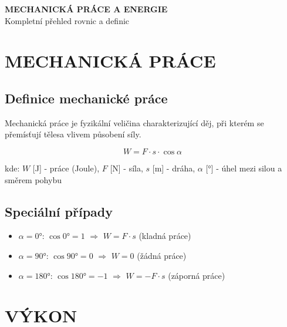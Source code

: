 \documentclass[a4paper,11pt]{article}
\begin{document}
\begin{center}
    {\Huge \textbf{MECHANICKÁ PRÁCE A ENERGIE}}\\[0.5cm]
    {\Large Kompletní přehled rovnic a definic}\\[1cm]
\end{center}

\section{MECHANICKÁ PRÁCE}

\subsection{Definice mechanické práce}

\begin{definitionbox}
Mechanická práce je fyzikální veličina charakterizující děj, při kterém se přemísťují tělesa vlivem působení síly.
\end{definitionbox}

\begin{equationbox}
\begin{equation*}
    W = F \cdot s \cdot \cos\alpha
\end{equation*}
\end{equationbox}

\begin{notebox}
kde: $W$ [J] - práce (Joule), $F$ [N] - síla, $s$ [m] - dráha, $\alpha$ [°] - úhel mezi silou a směrem pohybu
\end{notebox}

\subsection{Speciální případy}

\begin{notebox}
\begin{itemize}
    \item $\alpha = 0°$: $\cos 0° = 1$ $\Rightarrow$ $W = F \cdot s$ (kladná práce)
    \item $\alpha = 90°$: $\cos 90° = 0$ $\Rightarrow$ $W = 0$ (žádná práce)
    \item $\alpha = 180°$: $\cos 180° = -1$ $\Rightarrow$ $W = -F \cdot s$ (záporná práce)
\end{itemize}
\end{notebox}

\section{VÝKON}
\end{document}
